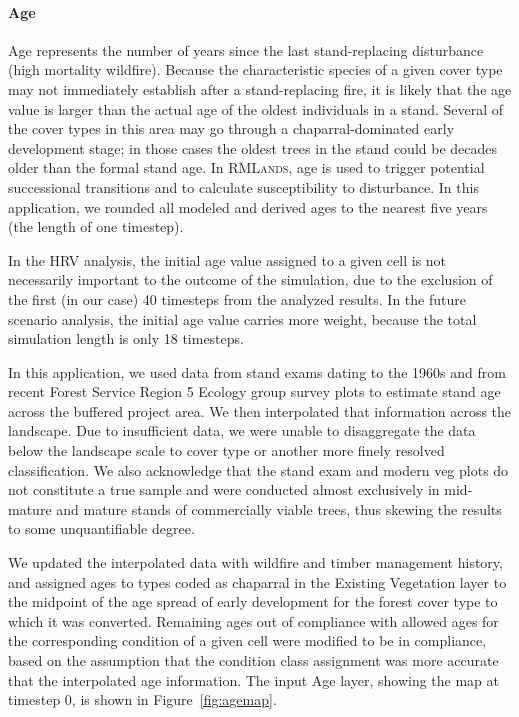 


\paragraph{Age}
Age represents the number of years since the last stand-replacing disturbance (high mortality wildfire). Because the characteristic species of a given cover type may not immediately establish after a stand-replacing fire, it is likely that the age value is larger than the actual age of the oldest individuals in a stand. Several of the cover types in this area may go through a chaparral-dominated early development stage; in those cases the oldest trees in the stand could be decades older than the formal stand age. In \textsc{RMLands}, age is used to trigger potential successional transitions and to calculate susceptibility to disturbance. In this application, we rounded all modeled and derived ages to the nearest five years (the length of one timestep).

In the HRV analysis, the initial age value assigned to a given cell is not necessarily important to the outcome of the simulation, due to the exclusion of the first (in our case) 40 timesteps from the analyzed results. In the future scenario analysis, the initial age value carries more weight, because the total simulation length is only 18 timesteps.

In this application, we used data from stand exams dating to the 1960s and from recent Forest Service Region 5 Ecology group survey plots to estimate stand age across the buffered project area. We then interpolated that information across the landscape. Due to insufficient data, we were unable to disaggregate the data below the landscape scale to cover type or another more finely resolved classification. We also acknowledge that the stand exam and modern veg plots do not constitute a true sample and were conducted almost exclusively in mid-mature and mature stands of commercially viable trees, thus skewing the results to some unquantifiable degree.

We updated the interpolated data with wildfire and timber management history, and assigned ages to types coded as chaparral in the Existing Vegetation layer to the midpoint of the age spread of early development for the forest cover type to which it was converted. Remaining ages out of compliance with allowed ages for the corresponding condition of a given cell were modified to be in compliance, based on the assumption that the condition class assignment was more accurate that the interpolated age information. The input Age layer, showing the map at timestep 0, is shown in Figure~\ref{fig:agemap}.


